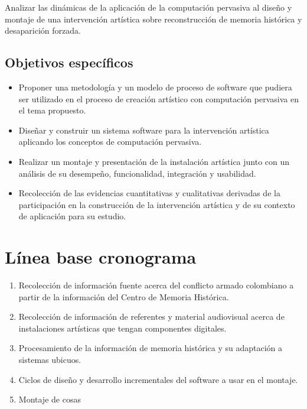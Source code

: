 Analizar las dinámicas de la aplicación de la computación pervasiva al diseño y montaje de una intervención artística sobre reconstrucción de memoria histórica y desaparición forzada.

\subsection{Objetivos específicos}

\begin{itemize}

    \item Proponer una metodología y un modelo de proceso de software que pudiera ser utilizado en el proceso de creación artístico con computación pervasiva en el tema propuesto.

    \item Diseñar y construir un sistema software para la intervención artística aplicando los conceptos de computación pervasiva.

    \item Realizar un montaje y presentación de la instalación artística junto con un análisis de su desempeño, funcionalidad, integración y usabilidad.

    \item Recolección de las evidencias cuantitativas y cualitativas derivadas de la participación en la construcción de la intervención artística y de su contexto de aplicación para su estudio.

\end{itemize}

\section{Línea base cronograma}

\begin{enumerate}
	\item \label{puntouno} Recolección de información fuente acerca del conflicto armado colombiano a partir de la información del Centro de Memoria Histórica.
	\item \label{puntodos} Recolección de información de referentes y material audiovisual acerca de instalaciones artísticas que tengan componentes digitales.
	\item \label{puntotres} Procesamiento de la información de memoria histórica y su adaptación a sistemas ubicuos.
	\item \label{puntocuatro} Ciclos de diseño y desarrollo incrementales del software a usar en el montaje.
	\item \label{puntocinco} Montaje de cosas

\end{enumerate}

